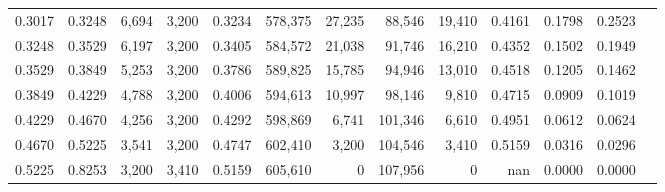 \begin{tabular}{rrrrrrrrrrrrr}
0.3017 & 0.3248 &  6,694 & 3,200 &                                     0.3234 & 578,375 &  27,235 &  88,546 &  19,410 & 0.4161 & 0.1798 & 0.2523 \\
0.3248 & 0.3529 &  6,197 & 3,200 &                                     0.3405 & 584,572 &  21,038 &  91,746 &  16,210 & 0.4352 & 0.1502 & 0.1949 \\
0.3529 & 0.3849 &  5,253 & 3,200 &                                     0.3786 & 589,825 &  15,785 &  94,946 &  13,010 & 0.4518 & 0.1205 & 0.1462 \\
0.3849 & 0.4229 &  4,788 & 3,200 &                                     0.4006 & 594,613 &  10,997 &  98,146 &   9,810 & 0.4715 & 0.0909 & 0.1019 \\
0.4229 & 0.4670 &  4,256 & 3,200 &                                     0.4292 & 598,869 &   6,741 & 101,346 &   6,610 & 0.4951 & 0.0612 & 0.0624 \\
0.4670 & 0.5225 &  3,541 & 3,200 &                                     0.4747 & 602,410 &   3,200 & 104,546 &   3,410 & 0.5159 & 0.0316 & 0.0296 \\
0.5225 & 0.8253 &  3,200 & 3,410 &                                     0.5159 & 605,610 &       0 & 107,956 &       0 &    nan & 0.0000 & 0.0000 \\
\bottomrule
\end{tabular}
